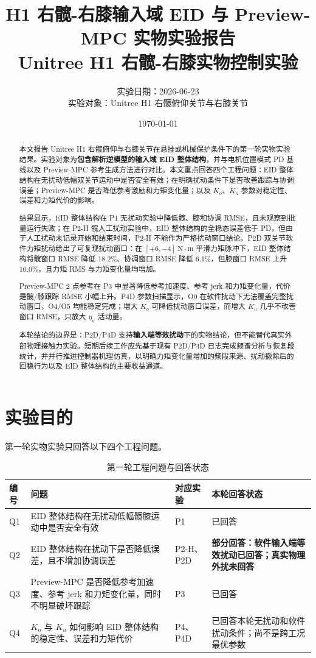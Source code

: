 \documentclass[12pt,a4paper]{ctexart}
\title{
    \vspace{1.2cm}
    \Huge \textbf{\color{mainblue} H1 右髋-右膝输入域 EID 与 Preview-MPC 实物实验报告 }\\[0.5em]
    \Large Unitree H1 右髋-右膝实物控制实验
}
\author{实验日期：2026-06-23\\[0.25em]
实验对象：Unitree H1 右髋俯仰关节与右膝关节\\[0.25em]
}
\date{\today}
\begin{document}
\maketitle
\thispagestyle{empty}

\begin{abstract}
本文报告 Unitree H1 右髋俯仰与右膝关节在悬挂或机械保护条件下的第一轮实物实验结果。实验对象为\textbf{包含解析逆模型的输入域 EID 整体结构}，并与电机位置模式 PD 基线以及 Preview-MPC 参考生成方法进行对比。本文重点回答四个工程问题：EID 整体结构在无扰动低幅双关节运动中是否安全有效；在明确扰动条件下是否改善跟踪与协调误差；Preview-MPC 是否降低参考激励和力矩变化量；以及 $K_o$、$K_u$ 参数对稳定性、误差和力矩代价的影响。

结果显示，EID 整体结构在 P1 无扰动实验中降低髋、膝和协调 RMSE，且未观察到批量运行失败；在 P2-H 髋人工扰动实验中，EID 整体结构的全稳态误差低于 PD，但由于人工扰动未记录开始和结束时间，P2-H 不能作为严格扰动窗口结论。P2D 双关节软件力矩扰动给出了可复现扰动窗口：在 $[+6,-4]\ \mathrm{N\cdot m}$ 平滑力矩脉冲下，EID 整体结构将髋窗口 RMSE 降低 18.2\%、协调窗口 RMSE 降低 6.1\%，但膝窗口 RMSE 上升 10.0\%，且力矩 RMS 与力矩变化量均增加。

Preview-MPC 2 点参考在 P3 中显著降低参考加速度、参考 jerk 和力矩变化量，代价是髋/膝跟踪 RMSE 小幅上升。P4D 参数扫描显示，O0 在软件扰动下无法覆盖完整扰动窗口，O4/O5 均能稳定完成；增大 $K_o$ 可降低扰动窗口误差，而增大 $K_u$ 几乎不改善窗口 RMSE，只放大 $\eta_u$ 活动量。

本轮结论的边界是：P2D/P4D 支持\textbf{输入端等效扰动}下的实物结论，但不能替代真实外部物理接触力实验。短期后续工作应先基于现有 P2D/P4D 日志完成频谱分析与恢复段统计，并并行推进控制器机理仿真，以明确力矩变化量增加的频段来源、扰动撤除后的回稳行为以及 EID 整体结构的主要收益通道。
\end{abstract}

\newpage
\tableofcontents
\newpage

\section{实验目的}


第一轮实物实验只回答以下四个工程问题。

\begin{table}[htbp]
\centering
\footnotesize
\caption{第一轮工程问题与回答状态}
\begin{tabularx}{\textwidth}{YYYY}
\toprule
编号 & 问题 & 对应实验 & 本轮回答状态 \\
\midrule
Q1 & EID 整体结构在无扰动低幅髋膝运动中是否安全有效 & P1 & 已回答 \\
Q2 & EID 整体结构在扰动下是否降低误差，且不增加协调误差 & P2-H、P2D & \textbf{部分回答：软件输入端等效扰动已回答；真实物理外扰未回答} \\
Q3 & Preview-MPC 是否降低参考加速度、参考 jerk 和力矩变化量，同时不明显破坏跟踪 & P3 & 已回答 \\
Q4 & $K_o$ 与 $K_u$ 如何影响 EID 整体结构的稳定性、误差和力矩代价 & P4、P4D & 已回答本轮无扰动和软件扰动条件；尚不是跨工况最优参数 \\
\bottomrule
\end{tabularx}
\end{table}
\end{document}
